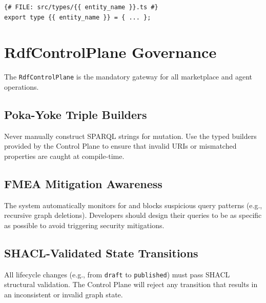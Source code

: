 \begin{verbatim}
{# FILE: src/types/{{ entity_name }}.ts #}
export type {{ entity_name }} = { ... };
\end{verbatim}

\section{RdfControlPlane Governance}

The \texttt{RdfControlPlane} is the mandatory gateway for all marketplace and agent operations.

\subsection{Poka-Yoke Triple Builders}
Never manually construct SPARQL strings for mutation. Use the typed builders provided by the Control Plane to ensure that invalid URIs or mismatched properties are caught at compile-time.

\subsection{FMEA Mitigation Awareness}
The system automatically monitors for and blocks suspicious query patterns (e.g., recursive graph deletions). Developers should design their queries to be as specific as possible to avoid triggering security mitigations.

\subsection{SHACL-Validated State Transitions}
All lifecycle changes (e.g., from \texttt{draft} to \texttt{published}) must pass SHACL structural validation. The Control Plane will reject any transition that results in an inconsistent or invalid graph state.
